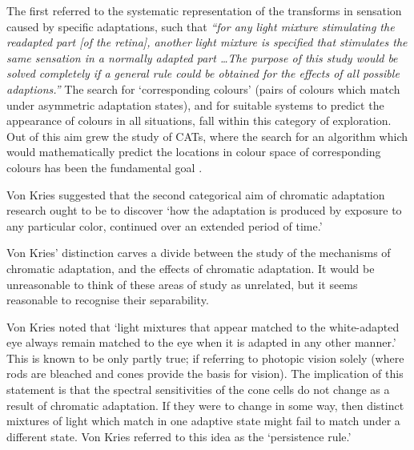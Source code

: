 The first referred to the systematic representation of the transforms in sensation caused by specific adaptations, such that \textit{``for any light mixture stimulating the readapted part [of the retina], another light mixture is specified that stimulates the same sensation in a normally adapted part \dots The purpose of this study would be solved completely if a general rule could be obtained for the effects of all possible adaptions.''} The search for `corresponding colours' (pairs of colours which match under asymmetric adaptation states), and for suitable systems to predict the appearance of colours in all situations, fall within this category of exploration. Out of this aim grew the study of \glspl{CAT}, where the search for an algorithm which would mathematically predict the locations in colour space of corresponding colours has been the fundamental goal \citep{cie_tc_1-52_cie_2004}.

Von Kries suggested that the second categorical aim of chromatic adaptation research ought to be to discover `how the adaptation is produced by exposure to any particular color, continued over an extended period of time.' 

Von Kries' distinction carves a divide between the study of the mechanisms of chromatic adaptation, and the effects of chromatic adaptation. It would be unreasonable to think of these areas of study as unrelated, but it seems reasonable to recognise their separability. 


Von Kries noted that `light mixtures that appear matched to the white-adapted eye always remain matched to the eye when it is adapted in any other manner.' This is known to be only partly true; if referring to photopic vision solely (where rods are bleached and cones provide the basis for vision). The implication of this statement is that the spectral sensitivities of the cone cells do not change as a result of chromatic adaptation. If they were to change in some way, then distinct mixtures of light which match in one adaptive state might fail to match under a different state. Von Kries referred to this idea as the `persistence rule.'

